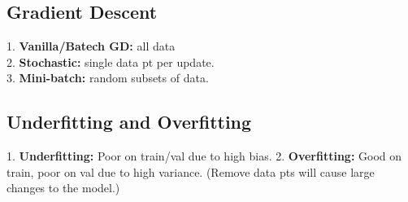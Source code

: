 \subsection{Gradient Descent}
1. \textbf{Vanilla/Batech GD:}  all data \\
2. \textbf{Stochastic:} single data pt per update.  \\
3. \textbf{Mini-batch:} random subsets of data.

\subsection{Underfitting and Overfitting}
1. \textbf{Underfitting:} Poor on train/val due to high bias.  
2. \textbf{Overfitting:} Good on train, poor on val due to high variance. (Remove data pts will cause large changes to the model.)

